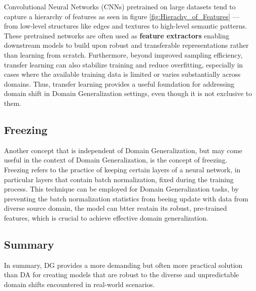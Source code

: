 Convolutional Neural Networks (CNNs) pretrained on large datasets tend to capture a hierarchy of features as seen in figure \ref{fig:Hierachy_of_Features} — from low-level structures like edges and textures to high-level semantic patterns. These pretrained networks are often used as \textbf{feature extractors} enabling downstream models to build upon robust and transferable representations rather than learning from scratch. Furthermore, beyond improved sampling efficiency, transfer learning can also stabilize training and reduce overfitting, especially in cases where the available training data is limited or varies substantially across domains. Thus, transfer learning provides a useful foundation for addressing domain shift in Domain Generalization settings, even though it is not exclusive to them.

\subsection{Freezing}
Another concept that is independent of Domain Generalization, but may come useful in the context of Domain Generalization, is the concept of freezing.
Freezing refers to the practice of keeping certain layers of a neural network, in particular layers that contain batch normalization, fixed during the training process. This technique can be employed for Domain Generalization tasks, by preventing the batch normalization statistics from beeing update with data from diverse source domain, the model can btter reatain its robust, pre-trained features, which is crucial to achieve effective domain generalization. \cite{gulrajaniSearchLostDomain2020,zhouMixStyleNeuralNetworks2023}


\subsection*{Summary}
In summary, DG provides a more demanding but often more practical solution than DA for creating models that are robust to the diverse and unpredictable domain shifts encountered in real-world scenarios.

\clearpage